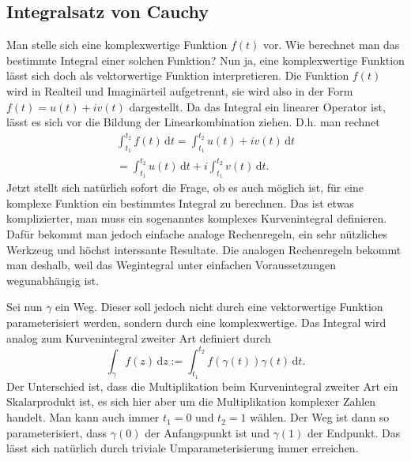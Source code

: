 \documentclass[a4paper,10pt,fleqn,twocolumn,twoside]{article}
\begin{document}
\subsection{Integralsatz von Cauchy}

Man stelle sich eine komplexwertige Funktion \(f(t)\) vor.
Wie berechnet man das bestimmte Integral einer solchen Funktion?
Nun ja, eine komplexwertige Funktion lässt sich doch als vektorwertige
Funktion interpretieren. Die Funktion \(f(t)\) wird in Realteil und
Imaginärteil aufgetrennt, sie wird also in der Form
\(f(t)=u(t)+iv(t)\) dargestellt.
Da das Integral ein linearer Operator ist,
lässt es sich vor die Bildung der Linearkombination ziehen.
D.h. man rechnet
\begin{gather*}
\int_{t_1}^{t_2} f(t)\,\mathrm dt
= \int_{t_1}^{t_2} u(t)+iv(t)\,\mathrm dt\\
= \int_{t_1}^{t_2} u(t)\,\mathrm dt + i\int_{t_1}^{t_2}
v(t)\,\mathrm dt.
\end{gather*}
Jetzt stellt sich natürlich sofort die Frage, ob es auch möglich ist,
für eine komplexe Funktion ein bestimmtes Integral zu berechnen.
Das ist etwas komplizierter, man muss ein sogenanntes komplexes
Kurvenintegral definieren. Dafür bekommt man jedoch einfache analoge
Rechenregeln, ein sehr nützliches Werkzeug und höchst interssante
Resultate. Die analogen Rechenregeln bekommt man deshalb,
weil das Wegintegral unter einfachen Voraussetzungen
wegunabhängig ist.

Sei nun \(\gamma\) ein Weg. Dieser soll jedoch nicht durch eine
vektorwertige Funktion parameterisiert werden, sondern durch
eine komplexwertige. Das Integral wird analog zum Kurvenintegral
zweiter Art definiert durch
\[\int_\gamma f(z)\,\mathrm dz
:= \int_{t_1}^{t_2} f(\gamma(t))\gamma(t)\,\mathrm dt.\]
Der Unterschied ist, dass die Multiplikation beim Kurvenintegral
zweiter Art ein Skalarprodukt ist, es sich hier aber um die
Multiplikation komplexer Zahlen handelt.
Man kann auch immer \(t_1=0\) und \(t_2=1\) wählen.
Der Weg ist dann so parameterisiert, dass \(\gamma(0)\)
der Anfangspunkt ist und \(\gamma(1)\) der Endpunkt. Das lässt
sich natürlich durch triviale Umparameterisierung immer erreichen.
\end{document}
